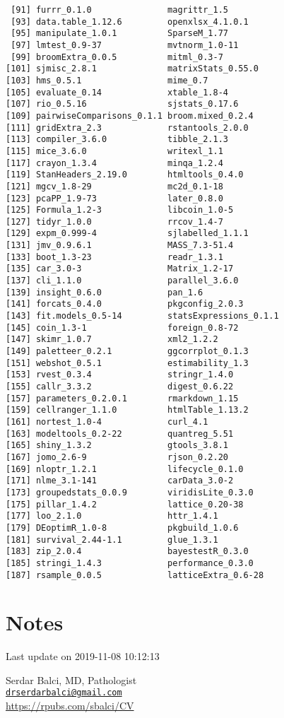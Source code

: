 \documentclass[]{article}
\begin{document}
\begin{verbatim}
 [91] furrr_0.1.0               magrittr_1.5             
 [93] data.table_1.12.6         openxlsx_4.1.0.1         
 [95] manipulate_1.0.1          SparseM_1.77             
 [97] lmtest_0.9-37             mvtnorm_1.0-11           
 [99] broomExtra_0.0.5          mitml_0.3-7              
[101] sjmisc_2.8.1              matrixStats_0.55.0       
[103] hms_0.5.1                 mime_0.7                 
[105] evaluate_0.14             xtable_1.8-4             
[107] rio_0.5.16                sjstats_0.17.6           
[109] pairwiseComparisons_0.1.1 broom.mixed_0.2.4        
[111] gridExtra_2.3             rstantools_2.0.0         
[113] compiler_3.6.0            tibble_2.1.3             
[115] mice_3.6.0                writexl_1.1              
[117] crayon_1.3.4              minqa_1.2.4              
[119] StanHeaders_2.19.0        htmltools_0.4.0          
[121] mgcv_1.8-29               mc2d_0.1-18              
[123] pcaPP_1.9-73              later_0.8.0              
[125] Formula_1.2-3             libcoin_1.0-5            
[127] tidyr_1.0.0               rrcov_1.4-7              
[129] expm_0.999-4              sjlabelled_1.1.1         
[131] jmv_0.9.6.1               MASS_7.3-51.4            
[133] boot_1.3-23               readr_1.3.1              
[135] car_3.0-3                 Matrix_1.2-17            
[137] cli_1.1.0                 parallel_3.6.0           
[139] insight_0.6.0             pan_1.6                  
[141] forcats_0.4.0             pkgconfig_2.0.3          
[143] fit.models_0.5-14         statsExpressions_0.1.1   
[145] coin_1.3-1                foreign_0.8-72           
[147] skimr_1.0.7               xml2_1.2.2               
[149] paletteer_0.2.1           ggcorrplot_0.1.3         
[151] webshot_0.5.1             estimability_1.3         
[153] rvest_0.3.4               stringr_1.4.0            
[155] callr_3.3.2               digest_0.6.22            
[157] parameters_0.2.0.1        rmarkdown_1.15           
[159] cellranger_1.1.0          htmlTable_1.13.2         
[161] nortest_1.0-4             curl_4.1                 
[163] modeltools_0.2-22         quantreg_5.51            
[165] shiny_1.3.2               gtools_3.8.1             
[167] jomo_2.6-9                rjson_0.2.20             
[169] nloptr_1.2.1              lifecycle_0.1.0          
[171] nlme_3.1-141              carData_3.0-2            
[173] groupedstats_0.0.9        viridisLite_0.3.0        
[175] pillar_1.4.2              lattice_0.20-38          
[177] loo_2.1.0                 httr_1.4.1               
[179] DEoptimR_1.0-8            pkgbuild_1.0.6           
[181] survival_2.44-1.1         glue_1.3.1               
[183] zip_2.0.4                 bayestestR_0.3.0         
[185] stringi_1.4.3             performance_0.3.0        
[187] rsample_0.0.5             latticeExtra_0.6-28      
\end{verbatim}

\pagebreak

\hypertarget{notes}{%
\section{Notes}\label{notes}}

Last update on 2019-11-08 10:12:13

Serdar Balci, MD, Pathologist\\
\href{mailto:drserdarbalci@gmail.com}{\nolinkurl{drserdarbalci@gmail.com}}\\
\url{https://rpubs.com/sbalci/CV}

\pagebreak

\newpage
\end{document}

